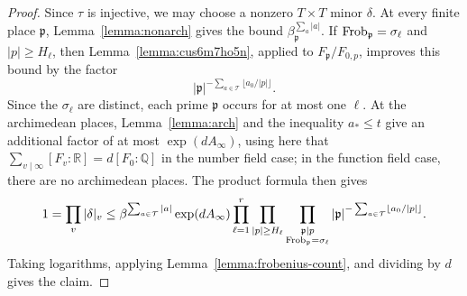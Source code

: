 \documentclass[reqno]{amsart} 
\begin{document}
\begin{proof}
  Since $\tau$ is injective, we may choose a nonzero $T \times T$ minor $\delta$.  At every finite place $\mathfrak{p}$, Lemma~\ref{lemma:nonarch} gives the bound $\beta_{\mathfrak{p}}^{\sum_a|a|}$.  If $\operatorname{Frob}_{\mathfrak{p}}=\sigma_\ell$ and $|p|\geq H_\ell$, then Lemma~\ref{lemma:cus6m7ho5n}, applied to $F_{\mathfrak{p}}/F_{0,p}$, improves this bound by the factor
  \begin{equation*}
    |\mathfrak{p}|^{-\sum_{a\in\mathcal{T}}\lfloor a_0/|p|\rfloor}.
  \end{equation*}
  Since the $\sigma_\ell$ are distinct, each prime $\mathfrak{p}$ occurs for at most one $\ell$.  At the archimedean places, Lemma~\ref{lemma:arch} and the inequality $a_*\leq t$ give an additional factor of at most $\exp(dA_\infty)$, using here that $\sum_{v\mid\infty}[F_v:\mathbb{R}]=d[F_0:\mathbb{Q}]$ in the number field case; in the function field case, there are no archimedean places.  The product formula then gives
  \begin{equation*}
    1=\prod_v|\delta|_v\leq\beta^{\sum_{a\in\mathcal{T}}|a|}\exp(dA_\infty)
    \prod_{\ell=1}^r
    \prod_{\substack{|p|\geq H_\ell}}
    \prod_{\substack{\mathfrak{p}\mid p\\\operatorname{Frob}_{\mathfrak{p}}=\sigma_\ell}}
    |\mathfrak{p}|^{-\sum_{a\in\mathcal{T}}\lfloor a_0/|p|\rfloor}.
  \end{equation*}
  Taking logarithms, applying Lemma~\ref{lemma:frobenius-count}, and dividing by $d$ gives the claim.
\end{proof}
\end{document}

